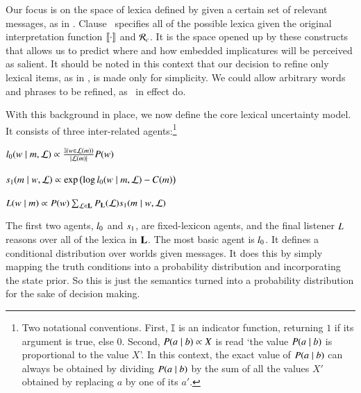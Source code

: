 \documentclass[leqno,12pt]{article}
\begin{document}
Our focus is on the space of lexica defined by
 given a certain set of relevant messages,
as in . Clause~
specifies all of the possible lexica given the original interpretation
function $\llbracket\cdot\rrbracket$ and $\mathcal{R}_{c}$. It is the space opened up by
these constructs that allows us to predict where and how embedded
implicatures will be perceived as salient. It should be noted in this
context that our decision to refine only lexical items, as in
, is made only for simplicity. We could
allow arbitrary words and phrases to be refined, as \CFS\ in effect
do.

With this background in place, we now define the core lexical
uncertainty model. It consists of three inter-related
agents:\footnote{Two notational conventions. First, $\mathbb{I}$ is an
  indicator function, returning $1$ if its argument is true, else
  $0$. Second, $P(a \mid b) \propto X$ is read `the value $P(a
  \mid b)$ is proportional to the value $X$'. In this context, the
  exact value of $P(a \mid b)$ can always be obtained by dividing
  $P(a \mid b)$ by the sum of all the values $X'$ obtained by
  replacing $a$ by one of its $a'$.}
%
\begin{examples}
\item\label{agents}
  \begin{examples}
  \item\label{l0}%
    $l_{0}(w \mid m, \mathcal{L}) \propto
    \frac{\mathbb{I}(w \in \mathcal{L}(m))}{|\mathcal{L}(m)|}
    P(w)$

  \item\label{s1}%
    $s_{1}(m \mid w, \mathcal{L}) \propto
    \exp
    \left(
      \log l_{0}(w \mid m, \mathcal{L})
      - 
      C(m)
    \right)$
    
  \item\label{L} 
    $L(w \mid m) 
    \propto 
    P(w)
    \sum_{\mathcal{L} \in \mathbf{L}}
    P_{\mathbf{L}}(\mathcal{L})
    s_{1}(m \mid w, \mathcal{L})$
  \end{examples}
\end{examples}

The first two agents, $l_{0}$ and $s_{1}$, are
fixed-lexicon agents, and the final listener $L$
reasons over all of the lexica in $\mathbf{L}$.  The most basic agent is
$l_{0}$. It defines a conditional distribution over worlds
given messages. It does this by simply mapping the truth conditions
into a probability distribution and incorporating the state prior. So
this is just the semantics turned into a probability distribution for
the sake of decision making.
\end{document}
